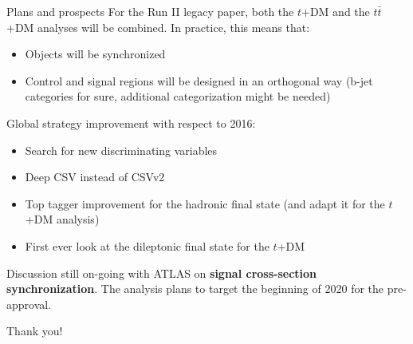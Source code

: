 \documentclass[9pt]{beamer}
\begin{document}
\begin{frame}{Plans and prospects}
\justifying
For the Run II legacy paper, both the $t$+DM and the $t \bar t$+DM analyses \alert{will be combined}. In practice, this means that: 

\begin{itemize}
\justifying
\item Objects will be synchronized
\item Control and signal regions will be designed in an orthogonal way (b-jet categories for sure, additional categorization might be needed)
\end{itemize} \vfill

Global \alert{strategy improvement} with respect to 2016:

\begin{itemize}
\justifying
\item Search for new discriminating variables
\item Deep CSV instead of CSVv2
\item Top tagger improvement for the hadronic final state (and adapt it for the $t$+DM analysis)
\item First ever look at the dileptonic final state for the $t$+DM
\end{itemize} \vfill
Discussion still on-going with ATLAS on \textbf{signal cross-section synchronization}. \vfill
The analysis plans to target \alert{the beginning of 2020} for the pre-approval. \vfill

\end{frame}


\makeatletter
\setlength{\metropolis@titleseparator@linewidth}{0pt}
\setlength{\metropolis@progressonsectionpage@linewidth}{0pt}
\setlength{\metropolis@progressinheadfoot@linewidth}{0pt}
\makeatother
\begin{frame}[standout]
Thank you!
\end{frame}

\appendix
\end{document}
